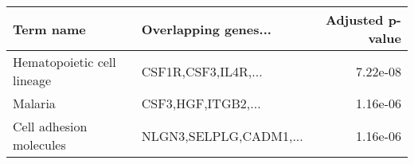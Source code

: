 \begin{tabular}{llr}
\toprule
                 Term name &   Overlapping genes... &  Adjusted p-value \\
\midrule
Hematopoietic cell lineage &    CSF1R,CSF3,IL4R,... &          7.22e-08 \\
                   Malaria &     CSF3,HGF,ITGB2,... &          1.16e-06 \\
   Cell adhesion molecules & NLGN3,SELPLG,CADM1,... &          1.16e-06 \\
\bottomrule
\end{tabular}
